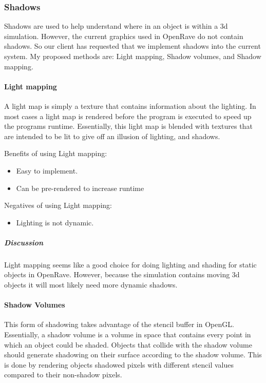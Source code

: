 \newpage
\subsubsection{Shadows}
Shadows are used to help understand where in an object is within a 3d simulation.
However, the current graphics used in OpenRave do not contain shadows.
So our client has requested that we implement shadows into the current system.
My proposed methods are: Light mapping, Shadow volumes, and Shadow mapping.

\paragraph{Light mapping}
A light map is simply a texture that contains information about the lighting. 
In most cases a light map is rendered before the program is executed to speed up the programs runtime.
Essentially, this light map is blended with textures that are intended to be lit to give off an illusion of lighting, and shadows.\cite{lightmapping}

Benefits of using Light mapping:
\begin{itemize}
\item Easy to implement.
\item Can be pre-rendered to increase runtime
\end{itemize}

Negatives of using Light mapping:
\begin{itemize}
\item Lighting is not dynamic.
\end{itemize}

\subparagraph{Discussion}
Light mapping seems like a good choice for doing lighting and shading for static objects in OpenRave.
However, because the simulation contains moving 3d objects it will most likely need more dynamic shadows.

\paragraph{Shadow Volumes}
This form of shadowing takes advantage of the stencil buffer in OpenGL.
Essentially, a shadow volume is a volume in space that contains every point in which an object could be shaded.
Objects that collide with the shadow volume should generate shadowing on their surface according to the shadow volume.
This is done by rendering objects shadowed pixels with different stencil values compared to their non-shadow pixels. \cite{volume}

